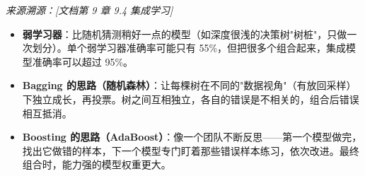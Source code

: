 \documentclass[a4paper,11pt]{ctexart}
\begin{document}
\begin{problembox}
    \vspace{0.2cm}
    {\color{gray}\small\textit{来源溯源：[文档第 9 章 9.4 集成学习]}}
\end{problembox}

\begin{beginnerbox}[小白必读：弱学习器 + 组合 = 强学习器，怎么实现的？]
    \begin{itemize}
        \item \textbf{弱学习器}：比随机猜测稍好一点的模型（如深度很浅的决策树"树桩"，只做一次划分）。单个弱学习器准确率可能只有 55\%，但把很多个组合起来，集成模型准确率可以超过 95\%。
        \item \textbf{Bagging 的思路（随机森林）}：让每棵树在不同的"数据视角"（有放回采样）下独立成长，再投票。树之间互相独立，各自的错误是不相关的，组合后错误相互抵消。
        \item \textbf{Boosting 的思路（AdaBoost）}：像一个团队不断反思——第一个模型做完，找出它做错的样本，下一个模型专门盯着那些错误样本练习，依次改进。最终组合时，能力强的模型权重更大。
    \end{itemize}
\end{beginnerbox}
\end{document}
